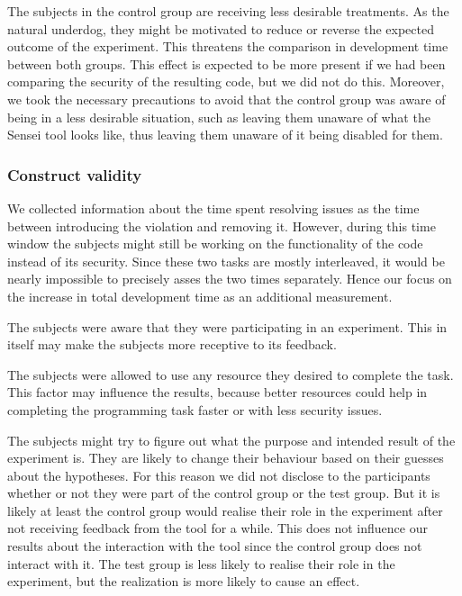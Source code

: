 The subjects in the control group are receiving less desirable treatments.
As the natural underdog, they might be motivated to reduce or reverse the expected outcome of the experiment.
This threatens the comparison in development time between both groups.
This effect is expected to be more present if we had been comparing the security of the resulting code, but we did not do this.
Moreover, we took the necessary precautions to avoid that the control group was aware of being in a less desirable situation, such as leaving them unaware of what the Sensei tool looks like, thus leaving them unaware of it being disabled for them.

\subsubsection{Construct validity}%
We collected information about the time spent resolving issues as the time between introducing the violation and removing it.
However, during this time window the subjects might still be working on the functionality of the code instead of its security.
Since these two tasks are mostly interleaved, it would be nearly impossible to precisely asses the two times separately.
Hence our focus on the increase in total development time as an additional measurement.

The subjects were aware that they were participating in an experiment.
This in itself may make the subjects more receptive to its feedback.

The subjects were allowed to use any resource they desired to complete the task.
This factor may influence the results, because better resources could help in completing the programming task faster or with less security issues.

The subjects might try to figure out what the purpose and intended result of the experiment is.
They are likely to change their behaviour based on their guesses about the hypotheses.
For this reason we did not disclose to the participants whether or not they were part of the control group or the test group.
But it is likely at least the control group would realise their role in the experiment after not receiving feedback from the tool for a while.
This does not influence our results about the interaction with the tool since the control group does not interact with it.
The test group is less likely to realise their role in the experiment, but the realization is more likely to cause an effect.

